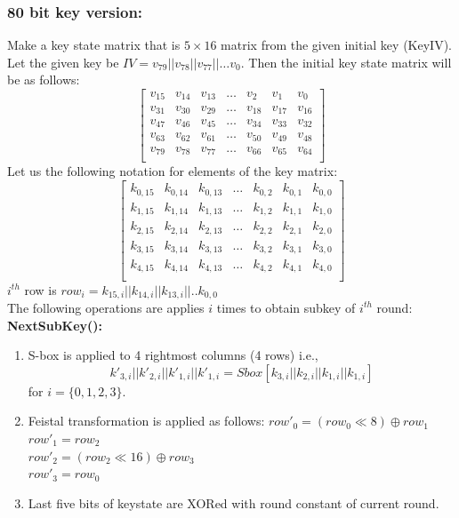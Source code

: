 \documentclass[final]{transcrypto}
\begin{document}
\subsubsection{80 bit key version:}
Make a key state matrix that is $5\times 16$ matrix from the given initial key (KeyIV).\\
Let the given key be $IV = v_{79}||v_{78}||v_{77}||\dots v_{0}$. Then the initial key state matrix will be as follows:
$$
\begin{bmatrix}
v_{15} & v_{14} & v_{13} & \dots & v_{2} & v_{1} & v_{0}\\
v_{31} & v_{30} & v_{29} & \dots & v_{18} & v_{17} & v_{16}\\
v_{47} & v_{46} & v_{45} & \dots & v_{34} & v_{33} & v_{32}\\
v_{63} & v_{62} & v_{61} & \dots & v_{50} & v_{49} & v_{48}\\
v_{79} & v_{78} & v_{77} & \dots & v_{66} & v_{65} & v_{64}\\
\end{bmatrix}
$$
Let us the following notation for elements of the key matrix:
$$
\begin{bmatrix}
k_{0,15} & k_{0,14} & k_{0,13} & \dots & k_{0,2} & k_{0,1} & k_{0,0}\\
k_{1,15} & k_{1,14} & k_{1,13} & \dots & k_{1,2} & k_{1,1} & k_{1,0}\\
k_{2,15} & k_{2,14} & k_{2,13} & \dots & k_{2,2} & k_{2,1} & k_{2,0}\\
k_{3,15} & k_{3,14} & k_{3,13} & \dots & k_{3,2} & k_{3,1} & k_{3,0}\\
k_{4,15} & k_{4,14} & k_{4,13} & \dots & k_{4,2} & k_{4,1} & k_{4,0}\\
\end{bmatrix}
$$
$i^{th}$ row is $row_{i} = k_{15,i}||k_{14,i}||k_{13,i}||..k_{0,0}$\\
\newline
The following operations are applies $i$ times to obtain subkey of $i^{th}$ round:\\
\textbf{NextSubKey():}\\
\begin{enumerate}
    \item S-box is applied to 4 rightmost columns (4 rows) i.e.,
$$k'_{3,i}||k'_{2,i}||k'_{1,i}||k'_{1,i} = Sbox[k_{3,i}||k_{2,i}||k_{1,i}||k_{1,i}]$$ for $i=\{0,1,2,3\}$.
    \item Feistal transformation is applied as follows:
$row'_0 = (row_0\ll 8)\oplus row_1$\\
$row'_1 = row_2$\\
$row'_2 = (row_2\ll 16)\oplus row_3$\\
$row'_3 = row_0$\\
    \item Last five bits of keystate are XORed with round constant of current round.\\
\end{enumerate}
\end{document}

